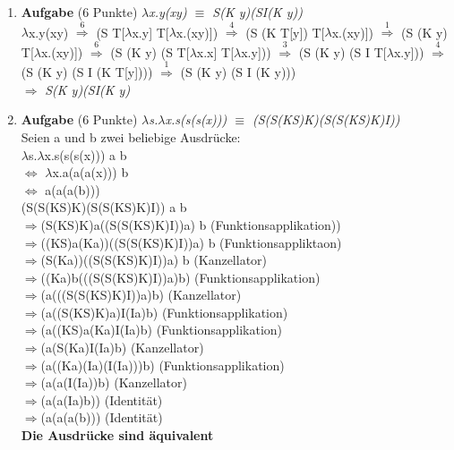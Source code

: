 \documentclass[11pt]{article}
\newcommand{\punkte}[1]{{\small{ }(#1 Punkte)}}
\newcommand{\aufgabe}[1]{\item{\bf #1}}
\begin{document}
\begin{enumerate}
\aufgabe{Aufgabe}\punkte{6}
\textit{$\lambda$x.y(xy) $\equiv$ S(K y)(SI(K y))}\\
$\lambda$x.y(xy) $\stackrel{6}{\Rightarrow}$  (S T[$\lambda$x.y] T[$\lambda$x.(xy)]) $\stackrel{4}{\Rightarrow}$ (S (K T[y]) T[$\lambda$x.(xy)]) $\stackrel{1}{\Rightarrow}$ (S (K y) T[$\lambda$x.(xy)]) $\stackrel{6}{\Rightarrow}$ (S (K y) (S T[$\lambda$x.x] T[$\lambda$x.y])) $\stackrel{3}{\Rightarrow}$ (S (K y) (S I T[$\lambda$x.y])) $\stackrel{4}{\Rightarrow}$ (S (K y) (S I (K T[y]))) $\stackrel{1}{\Rightarrow}$ (S (K y) (S I (K y)))\\
$\Rightarrow$ \textit{S(K y)(SI(K y)}
\newpage
\aufgabe{Aufgabe}\punkte{6}
\textit{$\lambda$s.$\lambda$x.s(s(s(x))) $\equiv$ (S(S(KS)K)(S(S(KS)K)I))}\\
Seien a und b zwei beliebige Ausdrücke:\\
$\lambda$s.$\lambda$x.s(s(s(x))) a b\\
$\Leftrightarrow$ $\lambda$x.a(a(a(x))) b\\
$\Leftrightarrow$ a(a(a(b)))\\
\newline
\newline
(S(S(KS)K)(S(S(KS)K)I)) a b\\
$\Rightarrow$(S(KS)K)a((S(S(KS)K)I))a) b               \hfill (Funktionsapplikation))\\
$\Rightarrow$((KS)a(Ka))((S(S(KS)K)I))a) b              \hfill (Funktionsappliktaon)\\
$\Rightarrow$(S(Ka))((S(S(KS)K)I))a) b                 \hfill (Kanzellator)\\
$\Rightarrow$((Ka)b(((S(S(KS)K)I))a)b)                  \hfill (Funktionsapplikation)\\
$\Rightarrow$(a(((S(S(KS)K)I))a)b)                     \hfill (Kanzellator)\\
$\Rightarrow$(a((S(KS)K)a)I(Ia)b)                       \hfill (Funktionsapplikation)\\
$\Rightarrow$(a((KS)a(Ka)I(Ia)b)                        \hfill (Funktionsapplikation)\\
$\Rightarrow$(a(S(Ka)I(Ia)b)                           \hfill (Kanzellator)\\
$\Rightarrow$(a((Ka)(Ia)(I(Ia)))b)                      \hfill (Funktionsapplikation)\\
$\Rightarrow$(a(a(I(Ia))b)                             \hfill (Kanzellator)\\
$\Rightarrow$(a(a(Ia)b))                                \hfill (Identität)\\
$\Rightarrow$(a(a(a(b)))                               \hfill (Identität)\\
\textbf{Die Ausdrücke sind äquivalent}



\end{enumerate}
\end{document}
